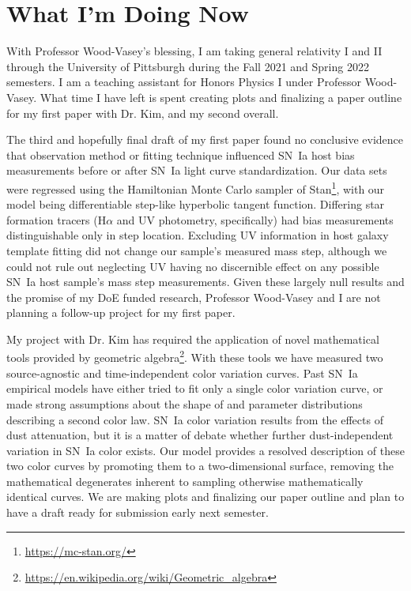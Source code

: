 \documentclass[modern]{aastex62}
\begin{document}
\section{What I'm Doing Now}
With Professor Wood-Vasey's blessing, I am taking general relativity I and II through the University of Pittsburgh during the Fall 2021 and Spring 2022 semesters. I am a teaching assistant for Honors Physics I under Professor Wood-Vasey.  What time I have left is spent creating plots and finalizing a paper outline for my first paper with Dr. Kim, and my second overall. 

The third and hopefully final draft of my first paper found no conclusive evidence that observation method or fitting technique influenced SN~Ia host bias measurements before or after SN~Ia light curve standardization. Our data sets were regressed using the Hamiltonian Monte Carlo sampler of Stan\footnote{\url{https://mc-stan.org/}}, with our model being differentiable step-like hyperbolic tangent function.  Differing star formation tracers (H$\alpha$ and UV photometry, specifically) had bias measurements distinguishable only in step location.  Excluding UV information in host galaxy template fitting did not change our sample's measured mass step, although we could not rule out neglecting UV having no discernible effect on any possible SN~Ia host sample's mass step measurements.  Given these largely null results and the promise of my DoE funded research, Professor Wood-Vasey and I are not planning a follow-up project for my first paper. 

My project with Dr. Kim has required the application of novel mathematical tools provided by geometric algebra\footnote{\url{https://en.wikipedia.org/wiki/Geometric_algebra}}.  With these tools we have measured two source-agnostic and time-independent color variation curves.  Past SN~Ia empirical models have either tried to fit only a single color variation curve, or made strong assumptions about the shape of and parameter distributions describing a second color law.  SN~Ia color variation results from the effects of dust attenuation, but it is a matter of debate whether further dust-independent variation in SN~Ia color exists.  Our model provides a resolved description of these two color curves by promoting them to a two-dimensional surface, removing the mathematical degenerates inherent to sampling otherwise mathematically identical curves.  We are making plots and finalizing our paper outline and plan to have a draft ready for submission early next semester.
\end{document}
